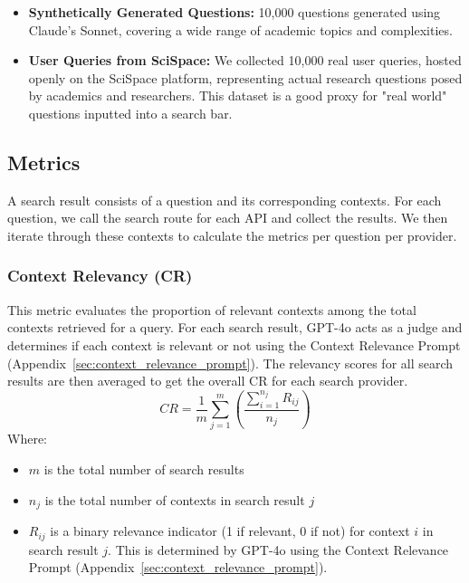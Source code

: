 \documentclass{article}
\begin{document}
\begin{multicols}{2}
\begin{itemize}
    \item \textbf{Synthetically Generated Questions:} 10,000 questions generated using Claude's Sonnet, covering a wide range of academic topics and complexities.
    \item \textbf{User Queries from SciSpace:} We collected 10,000 real user queries, hosted openly on the SciSpace platform, representing actual research questions posed by academics and researchers. This dataset is a good proxy for "real world" questions inputted into a search bar.
\end{itemize}

\subsection{Metrics}
A search result consists of a question and its corresponding contexts. For each question, we call the search route for each API and collect the results. We then iterate through these contexts to calculate the metrics per question per provider.

\subsubsection{Context Relevancy (CR)}
This metric evaluates the proportion of relevant contexts among the total contexts retrieved for a query. For each search result, GPT-4o acts as a judge and determines if each context is relevant or not using the Context Relevance Prompt (Appendix~\ref{sec:context_relevance_prompt}). The relevancy scores for all search results are then averaged to get the overall CR for each search provider.
\begin{equation}
CR = \frac{1}{m} \sum_{j=1}^{m} \left( \frac{\sum_{i=1}^{n_j} R_{ij}}{n_j} \right)
\end{equation}
Where:
\begin{itemize}
    \item $m$ is the total number of search results
    \item $n_j$ is the total number of contexts in search result $j$
    \item $R_{ij}$ is a binary relevance indicator (1 if relevant, 0 if not) for context $i$ in search result $j$. This is determined by GPT-4o using the Context Relevance Prompt (Appendix~\ref{sec:context_relevance_prompt}).
\end{itemize}


\end{multicols}
\end{document}
